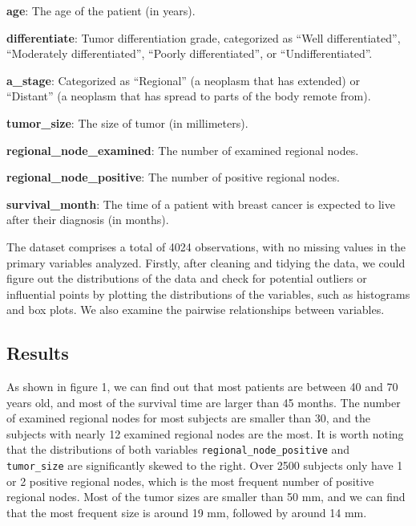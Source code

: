 \documentclass[
]{article}
\begin{document}
\textbf{age}: The age of the patient (in years).

\textbf{differentiate}: Tumor differentiation grade, categorized as
``Well differentiated'', ``Moderately differentiated'', ``Poorly
differentiated'', or ``Undifferentiated''.

\textbf{a\_stage}: Categorized as ``Regional'' (a neoplasm that has
extended) or ``Distant'' (a neoplasm that has spread to parts of the
body remote from).

\textbf{tumor\_size}: The size of tumor (in millimeters).

\textbf{regional\_node\_examined}: The number of examined regional
nodes.

\textbf{regional\_node\_positive}: The number of positive regional
nodes.

\textbf{survival\_month}: The time of a patient with breast cancer is
expected to live after their diagnosis (in months).

The dataset comprises a total of 4024 observations, with no missing
values in the primary variables analyzed. Firstly, after cleaning and
tidying the data, we could figure out the distributions of the data and
check for potential outliers or influential points by plotting the
distributions of the variables, such as histograms and box plots. We
also examine the pairwise relationships between variables.

\subsection{Results}\label{results}

As shown in figure 1, we can find out that most patients are between 40
and 70 years old, and most of the survival time are larger than 45
months. The number of examined regional nodes for most subjects are
smaller than 30, and the subjects with nearly 12 examined regional nodes
are the most. It is worth noting that the distributions of both
variables \texttt{regional\_node\_positive} and \texttt{tumor\_size} are
significantly skewed to the right. Over 2500 subjects only have 1 or 2
positive regional nodes, which is the most frequent number of positive
regional nodes. Most of the tumor sizes are smaller than 50 mm, and we
can find that the most frequent size is around 19 mm, followed by around
14 mm.
\end{document}
